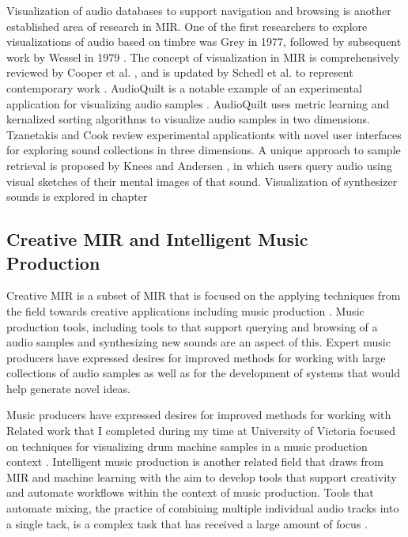Visualization of audio databases to support navigation and browsing is another established area of research in MIR. One of the first researchers to explore visualizations of audio based on timbre was Grey \cite{grey1977multidimensional} in 1977, followed by subsequent work by Wessel in 1979 \cite{wessel1979timbre}. The concept of visualization in MIR is comprehensively reviewed by Cooper et al. \cite{cooper2006visualization}, and is updated by Schedl et al. to represent contemporary work \cite{schedl2014music}. AudioQuilt is a notable example of an experimental application for visualizing audio samples \cite{fried2014audioquilt}. AudioQuilt uses metric learning and kernalized sorting algorithms to visualize audio samples in two dimensions. Tzanetakis and Cook \cite{tzanetakis20003d} review experimental applicationts with novel user interfaces for exploring sound collections in three dimensions. A unique approach to sample retrieval is proposed by Knees and Andersen \cite{knees2016searching}, in which users query audio using visual sketches of their mental images of that sound.  Visualization of synthesizer sounds is explored in chapter 

\subsection{Creative MIR and Intelligent Music Production}
Creative MIR is a subset of MIR that is focused on the applying techniques from the field towards creative applications including music production \cite{humphrey2013brief}. Music production tools, including tools to that support querying and browsing of a audio samples and synthesizing new sounds are an aspect of this. Expert music producers have expressed desires for improved methods for working with large collections of audio samples \cite{andersen2016conversations} as well as for the development of systems that would help generate novel ideas. 

Music producers have expressed desires for improved methods for working with  Related work that I completed during my time at University of Victoria focused on techniques for visualizing drum machine samples in a music production context \cite{shier2021manifold}. Intelligent music production \cite{moffat2019approaches} is another related field that draws from MIR and machine learning with the aim to develop tools that support creativity and automate workflows within the context of music production. Tools that automate mixing, the practice of combining multiple individual audio tracks into a single tack, is a complex task that has received a large amount of focus \cite{de2017ten}.


